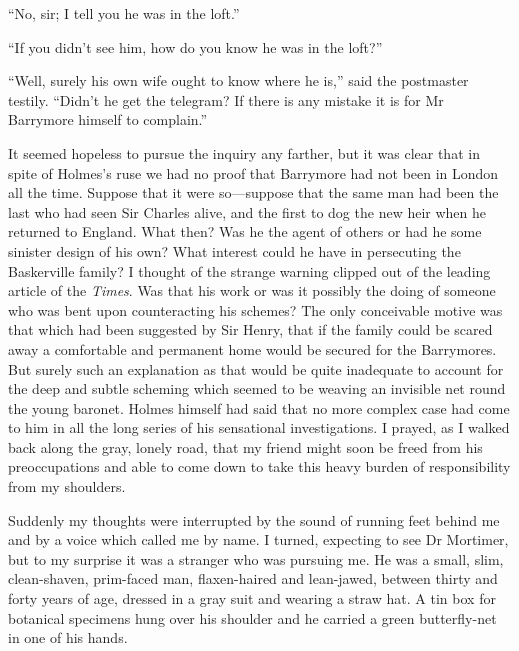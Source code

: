 \documentclass[paper=a5,BCOR=7mm,twoside,DIV=calc,12pt,usegeometry,openany,chapterprefix,endperiod,headings=big]{scrbook} %
\begin{document}
\enquote{No, sir; I tell you he was in the loft.}

\enquote{If you didn't see him, how do you know he was in the loft?}

\enquote{Well, surely his own wife ought to know where he is,} said the postmaster testily. \enquote{Didn't he get the telegram? If there is any mistake it is for Mr Barrymore himself to complain.}

It seemed hopeless to pursue the inquiry any farther, but it was clear that in spite of Holmes's ruse we had no proof that Barrymore had not been in London all the time. Suppose that it were so---suppose that the same man had been the last who had seen Sir Charles alive, and the first to dog the new heir when he returned to England. What then? Was he the agent of others or had he some sinister design of his own? What interest could he have in persecuting the Baskerville family? I thought of the strange warning clipped out of the leading article of the \textit{Times}. Was that his work or was it possibly the doing of someone who was bent upon counteracting his schemes? The only conceivable motive was that which had been suggested by Sir Henry, that if the family could be scared away a comfortable and permanent home would be secured for the Barrymores. But surely such an explanation as that would be quite inadequate to account for the deep and subtle scheming which seemed to be weaving an invisible net round the young baronet. Holmes himself had said that no more complex case had come to him in all the long series of his sensational investigations. I prayed, as I walked back along the gray, lonely road, that my friend might soon be freed from his preoccupations and able to come down to take this heavy burden of responsibility from my shoulders.

Suddenly my thoughts were interrupted by the sound of running feet behind me and by a voice which called me by name. I turned, expecting to see Dr Mortimer, but to my surprise it was a stranger who was pursuing me. He was a small, slim, clean-shaven, prim-faced man, flaxen-haired and lean-jawed, between thirty and forty years of age, dressed in a gray suit and wearing a straw hat. A tin box for botanical specimens hung over his shoulder and he carried a green butterfly-net in one of his hands.
\end{document}
